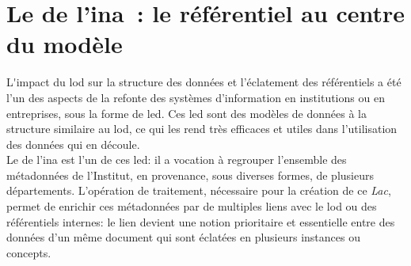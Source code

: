 \chapter{\label{III-B}Le \ldd de l’\ac{ina} : le référentiel au centre du modèle}

\lettrine{L}'impact du \ac{lod} sur la structure des données et l'éclatement des référentiels a été l'un des aspects de la refonte des systèmes d'information en institutions ou en entreprises, sous la forme de \ac{led}. Ces \ac{led} sont des modèles de données à la structure similaire au \ac{lod}, ce qui les rend très efficaces et utiles dans l'utilisation des données qui en découle.\\

Le \ldd de l'\ac{ina} est l'un de ces \ac{led}: il a vocation à regrouper l'ensemble des métadonnées de l'Institut, en provenance, sous diverses formes, de plusieurs départements.  L'opération de traitement, nécessaire pour la création de ce \textit{Lac}, permet de enrichir ces métadonnées par de multiples liens avec le \ac{lod} ou des référentiels internes: le lien devient une notion prioritaire et essentielle entre des données d'un même document qui sont éclatées en plusieurs instances ou concepts.




